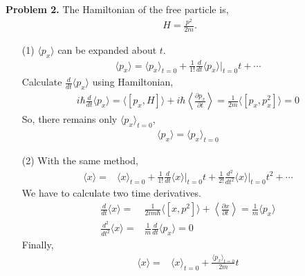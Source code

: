 \documentclass[aps,floatfix,nofootinbib,superscriptaddress,fleqn]{revtex4}
\begin{document}
\noindent \textbf{Problem 2.} The Hamiltonian of the free particle is,
\begin{align}
          H = \frac{p^2}{2m}.
\end{align}
\begin{itemize}

  \item[(1)] $\langle p_x \rangle$ can be expanded about $t$.
    \begin{align}
      \langle p_x \rangle = \langle p_x \rangle_{t=0}+\frac{1}{1!}\frac{d}{dt}\langle p_x \rangle \Bigg|_{t=0}t+\cdots
    \end{align}
  Calculate $\frac{d}{dt}\langle p_x \rangle$ using Hamiltonian,
    \begin{align}
      i\hbar\frac{d}{dt}\langle p_x \rangle=\langle \left[p_x,H\right] \rangle+i\hbar \left\langle \frac{\partial p_x}{\partial t} \right\rangle
      =\frac{1}{2m}\langle \left[p_x,p_x^2\right] \rangle = 0
    \end{align}
  So, there remains only $ \langle p_x \rangle_{t=0}$,
    \begin{align}
      \langle p_x\rangle = \langle p_x \rangle_{t=0}
    \end{align}

  \item[(2)] With the same method,
   \begin{align}
    \langle x\rangle=&\langle x\rangle_{t=0}+\frac{1}{1!}\frac{d}{dt}\langle x \rangle \Bigg|_{t=0}t+\frac{1}{2!}\frac{d^2}{dt^2}\langle x \rangle \Bigg|_{t=0}t^2+\cdots
   \end{align}
   We have to calculate two time derivatives.
   \begin{align}          
    \frac{d}{dt}\langle x \rangle =& \frac{1}{2im\hbar}\langle \left[x,p^2\right] \rangle+\left\langle \frac{\partial x}{\partial t} \right\rangle
                                  =  \frac{1}{m}\langle p_x \rangle \\
    \frac{d^2}{dt^2}\langle x \rangle =& \frac{1}{m}\frac{d}{dt}\langle p_x \rangle=0
   \end{align}
  Finally,
    \begin{align}
      \langle x\rangle=&\langle x\rangle_{t=0}+\frac{\langle p_x \rangle_{t=0}}{2m}t
    \end{align}


\end{itemize}
\end{document}
